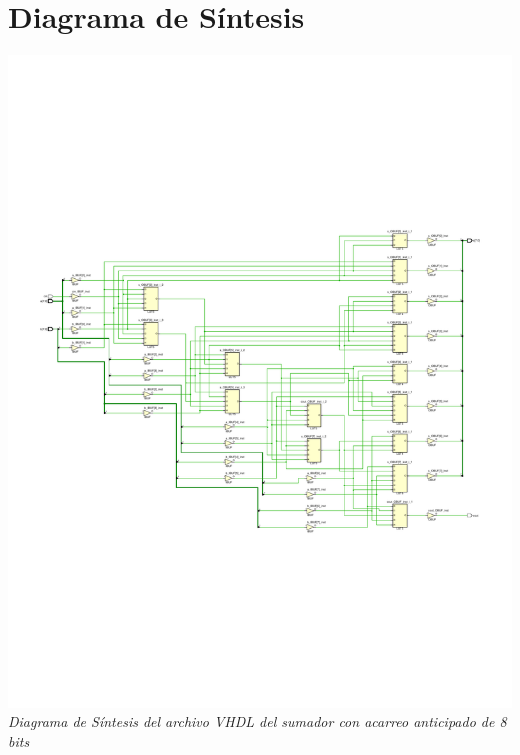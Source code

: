 \documentclass[12pt,executivepaper]{article}
\begin{document}
\section{Diagrama de Síntesis}
\begin{center}
    \includegraphics[scale=0.7]{sources/synthesisDiagram.pdf}
    \textit{Diagrama de Síntesis del archivo VHDL del sumador con acarreo anticipado de 8 bits}
\end{center}
\end{document}
